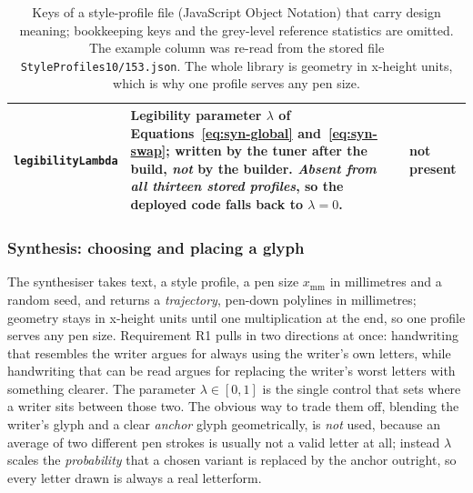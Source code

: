 \begin{table}[!htbp]
\begin{tabularx}{\linewidth}{|p{2.6cm}|X|p{2.1cm}|}
\hline
\texttt{legibilityLambda} & Legibility parameter $\lambda$ of Equations~\ref{eq:syn-global} and~\ref{eq:syn-swap}; written by the tuner after the build, \emph{not} by the builder. \emph{Absent from all thirteen stored profiles}, so the deployed code falls back to $\lambda=0$. & not present \\
\hline
\end{tabularx}
\caption{Keys of a style-profile file (JavaScript Object Notation) that carry design meaning; bookkeeping keys and the grey-level reference statistics are omitted. The example column was re-read from the stored file \texttt{StyleProfiles10/153.json}. The whole library is geometry in x-height units, which is why one profile serves any pen size.}
\label{tab:sty-schema}
\end{table}

\subsubsection{Synthesis: choosing and placing a glyph}
\label{sec:syn-glyph}
\label{sec:syn-place}

The synthesiser takes text, a style profile, a pen size $x_{\mathrm{mm}}$ in millimetres and a random seed, and returns a \emph{trajectory}, pen-down polylines in millimetres; geometry stays in x-height units until one multiplication at the end, so one profile serves any pen size. Requirement R1 pulls in two directions at once: handwriting that resembles the writer argues for always using the writer's own letters, while handwriting that can be read argues for replacing the writer's worst letters with something clearer. The parameter $\lambda\in[0,1]$ is the single control that sets where a writer sits between those two. The obvious way to trade them off, blending the writer's glyph and a clear \emph{anchor} glyph geometrically, is \emph{not} used, because an average of two different pen strokes is usually not a valid letter at all; instead $\lambda$ scales the \emph{probability} that a chosen variant is replaced by the anchor outright, so every letter drawn is always a real letterform.


